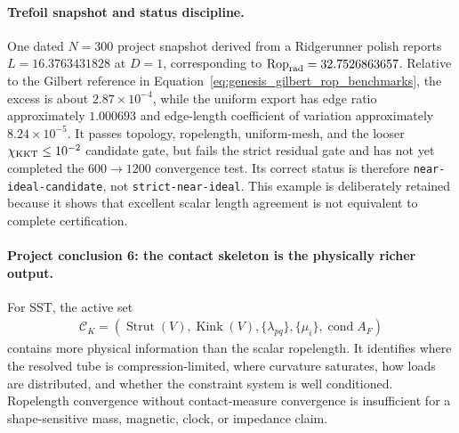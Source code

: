 \documentclass[11pt]{article}
\theoremstyle{definition}
\theoremstyle{plain}
\theoremstyle{remark}
\begin{document}
\paragraph{Trefoil snapshot and status discipline.}
One dated $N=300$ project snapshot derived from a Ridgerunner polish reports
$L=16.3763431828$ at $D=1$, corresponding to
$\operatorname{Rop}_{\rm rad}=32.7526863657$.  Relative to the Gilbert reference
in Equation~\eqref{eq:genesis_gilbert_rop_benchmarks}, the excess is about
$2.87\times10^{-4}$, while the uniform export has edge ratio approximately
$1.000693$ and edge-length coefficient of variation approximately
$8.24\times10^{-5}$.  It passes topology, ropelength, uniform-mesh, and the
looser $\chi_{\rm KKT}\le10^{-2}$ candidate gate, but fails the strict residual
gate and has not yet completed the $600\rightarrow1200$ convergence test.
Its correct status is therefore \texttt{near-ideal-candidate}, not
\texttt{strict-near-ideal}.  This example is deliberately retained because it
shows that excellent scalar length agreement is not equivalent to complete
certification.

\paragraph{Project conclusion 6: the contact skeleton is the physically richer output.}
For SST, the active set
\begin{align}
    \mathcal C_K
    =
    \left(
        \operatorname{Strut}(V),
        \operatorname{Kink}(V),
        \{\lambda_{pq}\},
        \{\mu_i\},
        \operatorname{cond}A_F
    \right)
    \label{eq:genesis_contact_skeleton}
\end{align}
contains more physical information than the scalar ropelength.  It identifies
where the resolved tube is compression-limited, where curvature saturates, how
loads are distributed, and whether the constraint system is well conditioned.
Ropelength convergence without contact-measure convergence is insufficient for
a shape-sensitive mass, magnetic, clock, or impedance claim.
\end{document}
